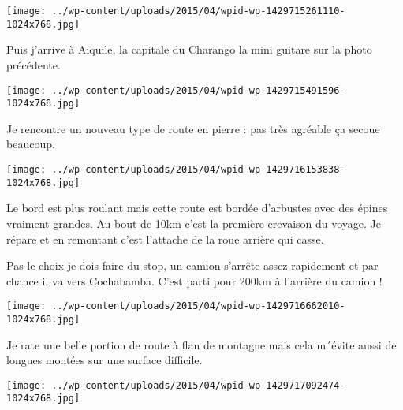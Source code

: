  

\begin{center} \texttt{[image: ../wp-content/uploads/2015/04/wpid-wp-1429715261110-1024x768.jpg]} \end{center}

 

 Puis j'arrive à Aiquile, la capitale du Charango la mini guitare sur la photo précédente. 

 

\begin{center} \texttt{[image: ../wp-content/uploads/2015/04/wpid-wp-1429715491596-1024x768.jpg]} \end{center}

 

 Je rencontre un nouveau type de route en pierre : pas très agréable ça secoue beaucoup. 

 

\begin{center} \texttt{[image: ../wp-content/uploads/2015/04/wpid-wp-1429716153838-1024x768.jpg]} \end{center}

 

 Le bord est plus roulant mais cette route est bordée d'arbustes avec des épines vraiment grandes. Au bout de 10km c'est la première crevaison du voyage. Je répare et en remontant c'est l'attache de la roue arrière qui casse. 

 Pas le choix je dois faire du stop, un camion s'arrête assez rapidement et par chance il va vers Cochabamba. C'est parti pour 200km à l'arrière du camion ! 

 

\begin{center} \texttt{[image: ../wp-content/uploads/2015/04/wpid-wp-1429716662010-1024x768.jpg]} \end{center}

 

 Je rate une belle portion de route à flan de montagne mais cela m´évite aussi de longues montées sur une surface difficile. 

 

\begin{center} \texttt{[image: ../wp-content/uploads/2015/04/wpid-wp-1429717092474-1024x768.jpg]} \end{center}

 

 

